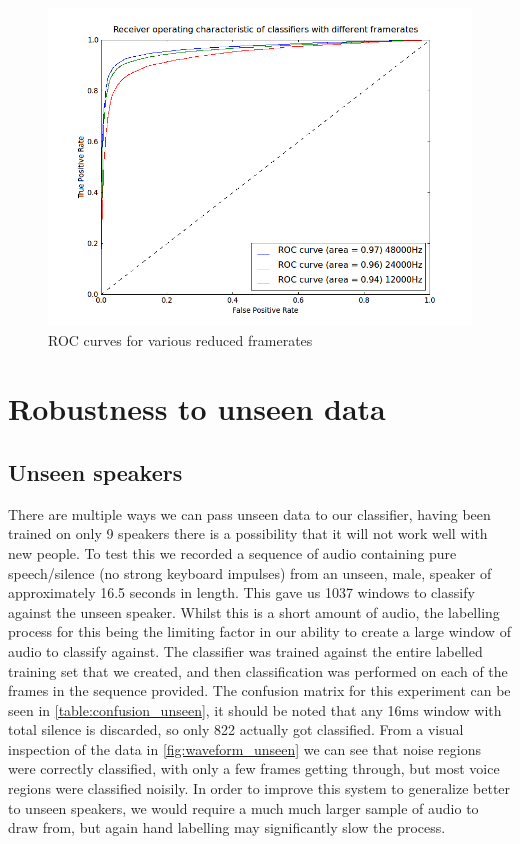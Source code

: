 \documentclass[ %
                    author={Sam Phippen},
                supervisor={Dr. Rafal Bogacz},
                     title={Real time voice activity detectors in noisy personal computing environments},
                  subtitle={},
                    degree={MEng},
                      year={2012} ]{thesis}
\begin{document}
\begin{figure}
    \label{fig:roc-frameratecrush}
    \includegraphics[width=15cm]{roc_framerates.png}
    \caption{ROC curves for various reduced framerates}
\end{figure}

\section {Robustness to unseen data}

\subsection{Unseen speakers}
There are multiple ways we can pass unseen data to our classifier, having been
trained on only 9 speakers there is a possibility that it will not work well
with new people. To test this we recorded a sequence of audio containing pure
speech/silence (no strong keyboard impulses) from an unseen, male, speaker of
approximately 16.5 seconds in length. This gave us 1037 windows to classify
against the unseen speaker. Whilst this is a short amount of audio, the
labelling process for this being the limiting factor in our ability to create a
large window of audio to classify against. The classifier was trained against
the entire labelled training set that we created, and then classification was
performed on each of the frames in the sequence provided. The confusion matrix
for this experiment can be seen in \ref{table:confusion_unseen}, it should be
noted that any 16ms window with total silence is discarded, so only 822
actually got classified. From a visual inspection of the data in
\ref{fig:waveform_unseen} we can see that noise regions were correctly classified, with
only a few frames getting through, but most voice regions were classified
noisily. In order to improve this system to generalize better to unseen
speakers, we would require a much much larger sample of audio to draw from, but
again hand labelling may significantly slow the process.
\end{document}
